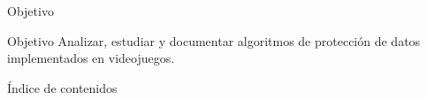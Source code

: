 
\begin{withoutheadfootline}
    \frame{\titlepage}
\end{withoutheadfootline}

\begin{frame}{Objetivo}
    \begin{block}{Objetivo}
        Analizar, estudiar y documentar algoritmos de protección de datos implementados en videojuegos.
    \end{block}
\end{frame}

\begin{frame}{Índice de contenidos}
    \tableofcontents
\end{frame}
